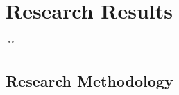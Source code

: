 \chapter{Research Results}
\begin{center}
    \textit{""}
\end{center}
\section{Research Methodology}